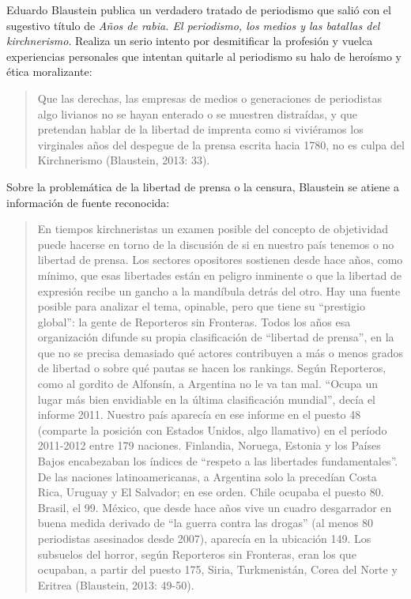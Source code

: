 Eduardo Blaustein publica un verdadero tratado de periodismo que salió con el sugestivo título de \emph{Años de rabia. El periodismo, los medios y las batallas del kirchnerismo}. Realiza un serio intento por desmitificar la profesión y vuelca experiencias personales que intentan quitarle al periodismo su halo de heroísmo y ética moralizante:

\begin{quote}
Que las derechas, las empresas de medios o generaciones de periodistas algo livianos no se hayan enterado o se muestren distraídas, y que pretendan hablar de la libertad de imprenta como si viviéramos los virginales años del despegue de la prensa escrita hacia 1780, no es culpa del Kirchnerismo (Blaustein, 2013: 33).
\end{quote}

Sobre la problemática de la libertad de prensa o la censura, Blaustein se atiene a información de fuente reconocida:

\begin{quote}
En tiempos kirchneristas un examen posible del concepto de objetividad puede hacerse en torno de la discusión de si en nuestro país tenemos o no libertad de prensa. Los sectores opositores sostienen desde hace años, como mínimo, que esas libertades están en peligro inminente o que la libertad de expresión recibe un gancho a la mandíbula detrás del otro. Hay una fuente posible para analizar el tema, opinable, pero que tiene su \enquote{prestigio global}: la gente de Reporteros sin Fronteras. Todos los años esa organización difunde su propia clasificación de \enquote{libertad de prensa}, en la que no se precisa demasiado qué actores contribuyen a más o menos grados de libertad o sobre qué pautas se hacen los rankings. Según Reporteros, como al gordito de Alfonsín, a Argentina no le va tan mal. \enquote{Ocupa un lugar más bien envidiable en la última clasificación mundial}, decía el informe 2011. Nuestro país aparecía en ese informe en el puesto 48 (comparte la posición con Estados Unidos, algo llamativo) en el período 2011-2012 entre 179 naciones. Finlandia, Noruega, Estonia y los Países Bajos encabezaban los índices de \enquote{respeto a las libertades fundamentales}. De las naciones latinoamericanas, a Argentina solo la precedían Costa Rica, Uruguay y El Salvador; en ese orden. Chile ocupaba el puesto 80. Brasil, el 99. México, que desde hace años vive un cuadro desgarrador en buena medida derivado de \enquote{la guerra contra las drogas} (al menos 80 periodistas asesinados desde 2007), aparecía en la ubicación 149. Los subsuelos del horror\textquotesingle, según Reporteros sin Fronteras, eran los que ocupaban, a partir del puesto 175, Siria, Turkmenistán, Corea del Norte y Eritrea (Blaustein, 2013: 49-50).
\end{quote}

